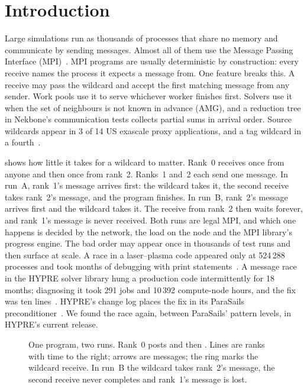 \section{Introduction}
\label{sec:intro}

Large simulations run as thousands of processes that share no memory and communicate by
sending messages. Almost all of them use the Message Passing Interface
(MPI)~\citep{mpi50}. MPI programs are usually deterministic by construction: every
receive names the process it expects a message from. One feature breaks this. A receive
may pass the wildcard \anysrc and accept the first matching message from any sender. Work
pools use it to serve whichever worker finishes first. Solvers use it when the set of
neighbours is not known in advance (AMG), and a reduction tree in Nekbone's communication
tests collects partial sums in arrival order. Source wildcards appear in 3 of 14 US exascale proxy
applications, and a tag wildcard in a fourth~\citep{sultana21proxy}.

 shows how little it takes for a wildcard to matter. Rank~0 receives
once from anyone and then once from rank~2. Ranks~1 and~2 each send one message. In
run~A, rank~1's message arrives first: the wildcard takes it, the second receive takes
rank~2's message, and the program finishes. In run~B, rank~2's message arrives first and
the wildcard takes it. The receive from rank~2 then waits forever, and rank~1's message
is never received. Both runs are legal MPI, and which one happens is decided by the network,
the load on the node and the MPI library's progress engine. The bad order may appear once
in thousands of test runs and then surface at scale. A race in a laser--plasma code appeared only at 524\,288 processes
and took months of debugging with print statements~\citep{laguna15cacm}. A message race
in the HYPRE solver library hung a production code intermittently for 18 months; diagnosing
it took 291 jobs and 10\,392 compute-node hours, and the fix was ten
lines~\citep{sato17ninja}. HYPRE's change log places the fix in its ParaSails
preconditioner~\citep{hypre-changelog}. We found the race again, between ParaSails' pattern
levels, in HYPRE's current release.

\begin{figure}[t]

\caption{One program, two runs. Rank~0 posts  and then
. Lines are ranks with time to the right; arrows are messages; the
ring marks the wildcard receive. In run~B the wildcard takes rank~2's message, the second
receive never completes and rank~1's message is lost.}
\label{fig:tworuns}
\end{figure}

